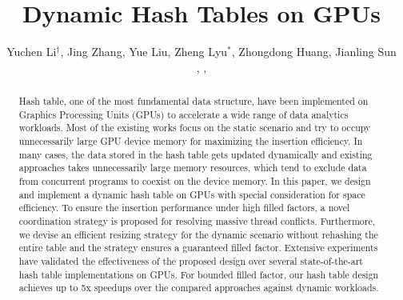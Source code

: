 \documentclass{vldb}
\begin{document}
\title{Dynamic Hash Tables on GPUs}



\author{
	\alignauthor
	Yuchen Li$^\dagger$, Jing Zhang, Yue Liu, Zheng Lyu$^*$, Zhongdong Huang, Jianling Sun\\
	,
	,
}
\maketitle

\begin{abstract}
Hash table, one of the most fundamental data structure,
have been implemented on Graphics Processing Units (GPUs) to accelerate a wide range of data analytics workloads. Most of the existing works focus on the static scenario and try to occupy unnecessarily large GPU device memory for maximizing the insertion efficiency. In many cases, the data stored in the hash table gets updated dynamically and existing approaches takes unnecessarily large memory resources, which tend to exclude data from concurrent programs to coexist on the device memory.
In this paper, we design and implement a dynamic hash table on GPUs with special consideration for space efficiency. To ensure the insertion performance under high filled factors, a novel coordination strategy is proposed for resolving massive thread conflicts. 
Furthermore,
we devise an efficient resizing strategy for the dynamic scenario without rehashing the entire table and the strategy ensures a guaranteed filled factor.
Extensive experiments have validated the effectiveness of the proposed design over several state-of-the-art hash table implementations on GPUs. For bounded filled factor, our hash table design achieves up to 5x speedups over the compared approaches against dynamic workloads. 
\end{abstract}














\pagebreak


\balance
\end{document}
